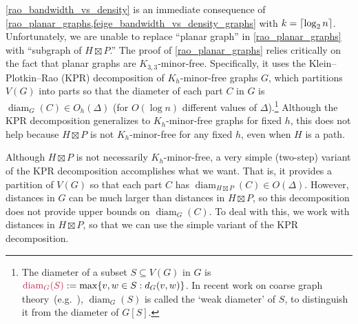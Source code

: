 \documentclass{patmorin}
\makeatletter
\newcommand{\david}[1]{{\color{orange} David: #1}}
\def\mathcolor#1#{\@mathcolor{#1}}
\def\@mathcolor#1#2#3{%
  \protect\leavevmode
  \begingroup
    \color#1{#2}#3%
  \endgroup
}
\newcommand{\mathdefin}[1]{\mathcolor{brightmaroon}{#1}}
\DeclareMathOperator{\diam}{diam}
\makeatother
\begin{document}
\cref{rao_bandwidth_vs_density} is an immediate consequence of \cref{rao_planar_graphs,feige_bandwidth_vs_density_graphs} with $k={\lceil \log_2 n \rceil}$.  Unfortunately, we are unable to replace ``planar graph'' in \cref{rao_planar_graphs} with ``subgraph of $H\boxtimes P$.''  The proof of \cref{rao_planar_graphs} relies critically on the fact that planar graphs are $K_{3,3}$-minor-free.  Specifically, it uses the Klein--Plotkin--Rao (KPR) decomposition \cite{klein.plotkin.ea:excluded} of $K_{h}$-minor-free graphs $G$, which partitions $V(G)$ into parts so that the diameter of each part $C$ in $G$ is $\diam_G(C)\in O_h(\Delta)$ (for $O(\log n)$ different values of $\Delta$).\footnote{The diameter of a subset $S\subseteq V(G)$ in $G$ is $\mathdefin{\diam_{G}(S)}:=\max\{v,w\in S:d_G(v,w)\}$. In recent work on coarse graph theory~(e.g.~\citep{DN23,BBEGLPS}), $\diam_G(S)$ is called the `weak diameter' of $S$, to distinguish it from the diameter of $G[S]$.}  Although the KPR decomposition generalizes to $K_h$-minor-free graphs for fixed $h$, this does not help because $H\boxtimes P$ is not $K_h$-minor-free for any fixed $h$, even when $H$ is a path.


Although $H\boxtimes P$ is not necessarily $K_h$-minor-free, a very simple (two-step) variant of the KPR decomposition accomplishes what we want.  That is, it provides a partition of $V(G)$ so that each part $C$ has $\diam_{H\boxtimes P}(C)\in O(\Delta)$. However, distances in $G$ can be much larger than distances in $H\boxtimes P$, so this decomposition does not provide upper bounds on $\diam_G(C)$.  To deal with this, we work with distances in $H\boxtimes P$, so that we can use the simple variant of the KPR decomposition.
\end{document}
